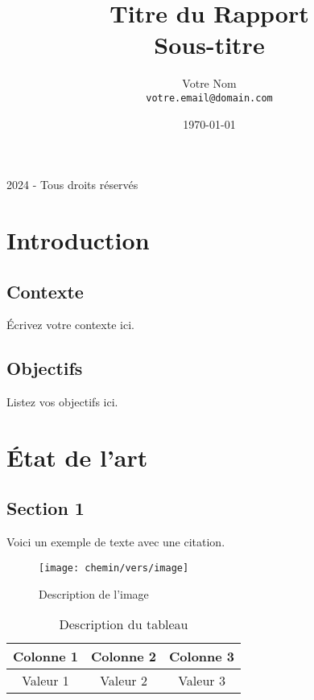\documentclass[12pt,a4paper]{report}  %
\title{{\Huge Titre du Rapport}\\[0.5cm]
       {\large Sous-titre}}
\author{Votre Nom\\
        \texttt{votre.email@domain.com}}
\date{\today}
\begin{document}
\maketitle

\clearpage
\thispagestyle{empty}
\vspace*{\fill}
\begin{center}
    \textcopyright{} 2024 - Tous droits réservés\\
    [Nom de votre organisation]
\end{center}
\vspace*{\fill}
\clearpage

\tableofcontents
\clearpage

\listoffigures
\clearpage

\listoftables
\clearpage

\chapter{Introduction}
\section{Contexte}
Écrivez votre contexte ici.

\section{Objectifs}
Listez vos objectifs ici.

\chapter{État de l'art}
\section{Section 1}
Voici un exemple de texte avec une citation\cite{reference1}.

\begin{figure}[htbp]
    \centering
    \texttt{[image: chemin/vers/image]}
    \caption{Description de l'image}
    \label{fig:exemple}
\end{figure}

\begin{table}[htbp]
    \centering
    \begin{tabular}{|c|c|c|}
        \hline
        Colonne 1 & Colonne 2 & Colonne 3 \\
        \hline
        Valeur 1 & Valeur 2 & Valeur 3 \\
        \hline
    \end{tabular}
    \caption{Description du tableau}
    \label{tab:exemple}
\end{table}
\end{document}

